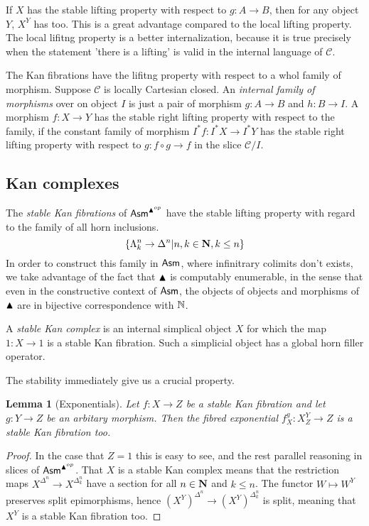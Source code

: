 \documentclass{amsart}
\theoremstyle{plain}
\newtheorem{lemma}[theorem]{Lemma}
\theoremstyle{definition}
\newcommand\hide[1]{}
\newcommand\cat\mathcal
\newcommand\set[1]{\left\{#1\right\}}
\begin{document}
If $X$ has the stable lifting property with respect to $g:A\to B$, then for any object $Y$, $X^Y$ has too. This is a great advantage compared to the local lifting property. The local lifitng property is a better internalization, because it is true precisely when the statement 'there is a lifting' is valid in the internal language of $\cat C$.

The Kan fibrations have the lifitng property with respect to a whol family of morphism. Suppose $\cat C$ is locally Cartesian closed. An \emph{internal family of morphisms} over on object $I$ is just a pair of morphism $g:A\to B$ and $h:B\to I$. A morphism $f:X\to Y$ has the stable right lifting property with respect to the family, if the constant family of morphism $I^* f:I^* X\to I^* Y$ has the stable right lifting property with respect to $g:f\circ g\to f$ in the slice $\cat C/I$. %

\subsection{Kan complexes}
The \emph{stable Kan fibrations} of $\mathsf{Asm}^{\blacktriangle^{op}}$ have the stable lifting property with regard to the family of all horn inclusions.
\[ \set{\Lambda^n_k \to \Delta^n|n,k\in \nno, k\leq n} \]
In order to construct this family in $\mathsf{Asm}$, where infinitrary colimits don't exists, we take advantage of the fact that $\blacktriangle$ is computably enumerable, in the sense that even in the constructive context of $\mathsf{Asm}$, the objects of objects and morphisms of $\blacktriangle$ are in bijective correspondence with $\mathbb N$.
\hide{gaan we dit nog uitwerken?}

A \emph{stable Kan complex} is an internal simplical object $X$ for which the map $1:X\to 1$ is a stable Kan fibration. Such a simplicial object has a global horn filler operator.

The stability immediately give us a crucial property.

\begin{lemma}[Exponentials] Let $f:X\to Z$ be a stable Kan fibration and let $g:Y\to Z$ be an arbitary morphism. Then the fibred exponential $f^g_X:X^Y_Z\to Z$ is a stable Kan fibration too. \label{exp}\end{lemma}

\begin{proof} In the case that $Z=1$ this is easy to see, and the rest parallel reasoning in slices of $\mathsf{Asm}^{\blacktriangle^{op}}$. That $X$ is a stable Kan complex means that the restriction maps $X^{\Delta^n} \to X^{\Delta^n_k}$ have a section for all $n\in \mathbf{N}$ and $k\leq n$. The functor $W\mapsto W^Y$ preserves split epimorphisms, hence $(X^Y)^{\Delta^n} \to (X^Y)^{\Delta^n_k}$ is split, meaning that $X^Y$ is a stable Kan fibration too.
\end{proof}
\end{document}
